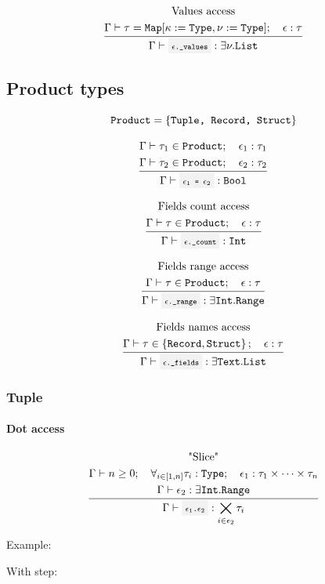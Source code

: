 \[
	\infrule{
		\text{Values access}\\*
		\EnvSym\then \tau = \Map[\kappa:=\Type,\nu:=\Type] \semiq \expr:\tau \\*
	}{
		\EnvSym\then \code{$\expr$.\_values}: \exists\nu.\List
	}
\]

\subsection{Product types}

\[
	\texttt{Product} = \left\{\texttt{Tuple, Record, Struct}\right\}
\]

\[
	\infrule{
		\EnvSym\then \tau_1 \in \Product \semiq \expr_1:\tau_1 \\*
		\EnvSym\then \tau_2 \in \Product \semiq \expr_2:\tau_2
	}{
		\EnvSym\then \code{$\expr_1$ = $\expr_2$}: \Bool
	}
\]

\[
	\infrule{
		\text{Fields count access} \\*
		\EnvSym\then \tau\in\Product \semiq \expr:\tau
	}{
		\EnvSym\then \code{$\expr$.\_count}: \Int
	}
\]

\[
	\infrule{
		\text{Fields range access} \\*
		\EnvSym\then \tau\in\Product \semiq \expr:\tau
	}{
		\EnvSym\then \code{$\expr$.\_range}: \exists\Int.\Range
	}
\]

\[
	\infrule{
		\text{Fields names access} \\*
		\EnvSym\then \tau\in\set{\Record,\Struct} \semiq \expr:\tau
	}{
		\EnvSym\then \code{$\expr$.\_fields}: \exists\Text.\List
	}
\]

\subsubsection{Tuple}

\paragraph{Dot access}

\[
	\infrule{
		\text{"Slice"}\\*
		\EnvSym\then n \geq 0 \semiq \forall_{i\in[1,n]}{\tau_i:\Type} \semiq \expr_1:\tau_1 \times \dotsb \times \tau_n \\*
		\EnvSym\then \expr_2:\exists\Int.\Range
	}{
		\EnvSym\then \code{$\expr_1$.$\expr_2$}: \bigtimes_{i \in \expr_2} \tau_i
	}
\]

Example: 

With step: 

